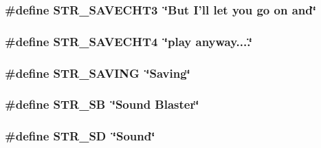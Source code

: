 \label{FOREIGN_8H_a726598228f06d149b6e91feeb0939e5e}
\hypertarget{FOREIGN_8H_a3b62ff592bd7af1c4553286fe05316f4}{
\subsubsection[{STR\_\-SAVECHT3}]{\setlength{\rightskip}{0pt plus 5cm}\#define STR\_\-SAVECHT3~\char`\"{}But I'll let you go on and\char`\"{}}}
\label{FOREIGN_8H_a3b62ff592bd7af1c4553286fe05316f4}
\hypertarget{FOREIGN_8H_acf59b550db73585ad91672500c4135d3}{
\subsubsection[{STR\_\-SAVECHT4}]{\setlength{\rightskip}{0pt plus 5cm}\#define STR\_\-SAVECHT4~\char`\"{}play anyway....\char`\"{}}}
\label{FOREIGN_8H_acf59b550db73585ad91672500c4135d3}
\hypertarget{FOREIGN_8H_a2c26916b0d075ed97997649b5dc32090}{
\subsubsection[{STR\_\-SAVING}]{\setlength{\rightskip}{0pt plus 5cm}\#define STR\_\-SAVING~\char`\"{}Saving\char`\"{}}}
\label{FOREIGN_8H_a2c26916b0d075ed97997649b5dc32090}
\hypertarget{FOREIGN_8H_a1347c73ea1636774fcbfcc2cc8468669}{
\subsubsection[{STR\_\-SB}]{\setlength{\rightskip}{0pt plus 5cm}\#define STR\_\-SB~\char`\"{}Sound Blaster\char`\"{}}}
\label{FOREIGN_8H_a1347c73ea1636774fcbfcc2cc8468669}
\hypertarget{FOREIGN_8H_a296de5ab2c43b957a2de8d5680f37fab}{
\subsubsection[{STR\_\-SD}]{\setlength{\rightskip}{0pt plus 5cm}\#define STR\_\-SD~\char`\"{}Sound\char`\"{}}}
\label{FOREIGN_8H_a296de5ab2c43b957a2de8d5680f37fab}
